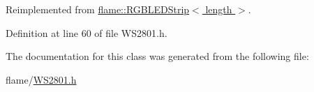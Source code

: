 Reimplemented from \hyperlink{classflame_1_1_r_g_b_l_e_d_strip_a4b30397b84e60b9f14bd3bef3129a60b}{flame\-::\-R\-G\-B\-L\-E\-D\-Strip$<$ length $>$}.



Definition at line 60 of file W\-S2801.\-h.



The documentation for this class was generated from the following file\-:\begin{DoxyCompactItemize}
\item 
flame/\hyperlink{_w_s2801_8h}{W\-S2801.\-h}\end{DoxyCompactItemize}
